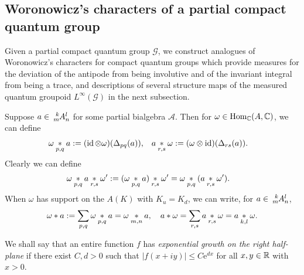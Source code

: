 \subsection{Woronowicz's characters of a partial compact quantum group}


Given a partial compact quantum group $\mathscr{G}$, we construct analogues of Woronowicz's characters for compact quantum groups which provide   measures for the deviation  of the antipode from being involutive and of the invariant integral from being a trace, and   descriptions of several structure maps  of the measured quantum groupoid $L^{\infty}(\mathscr{G})$ in the next subsection.


Suppose $a\in \Gr{A}{k}{l}{m}{n}$ for some partial bialgebra $\mathscr{A}$. Then for $\omega \in \operatorname{Hom}_{\mathbb{C}}(A,\mathbb{C})$, we can define
\begin{align*}
  \omega \underset{p,q}{\ast} a
&:= (\operatorname{id} \otimes \omega) (\Delta_{pq}(a)), & a \underset{r,s}{\ast}
\omega&:=(\omega \otimes \operatorname{id})(\Delta_{rs}(a)).\end{align*} 
Clearly we can define
\begin{align*} \omega \underset{p,q}{\ast} a \underset{r,s}{\ast}
\omega'&:= (\omega \underset{p,q}{\ast} a)\underset{r,s}{\ast} \omega' = \omega \underset{p,q}{\ast}(a \underset{r,s}{\ast} \omega').\end{align*}
When $\omega$ has support on the $A(K)$ with $K_u=K_d$, we can write, for $a\in \Gr{A}{k}{l}{m}{n}$, \[\omega\ast a := \sum_{p,q} \omega\underset{p,q}{\ast}a = \omega\underset{m,n}{\ast}a,\quad  a\ast \omega = \sum_{r,s} a\underset{r,s}{\ast}\omega = a\underset{k,l}{\ast}\omega.\] 

We shall say that an entire function $f$ has \emph{exponential growth
  on the right half-plane} if there exist $C,d>0$ such that $|f(x+iy)|\leq
C\mathrm{e}^{dx}$  for all $x,y\in \mathbb{R}$ with $x>0$. 

